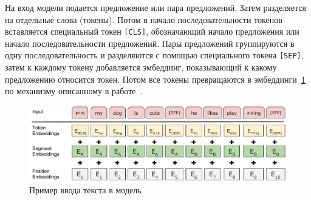\documentclass[PI, VKR]{HSEUniversity}
\begin{document}
На вход модели подается предложение или пара предложений. Затем разделяется на отдельные слова (токены). Потом в начало последовательности токенов вставляется специальный токен \texttt{[CLS]}, обозначающий начало предложения или начало последовательности предложений. Пары предложений группируются в одну последовательность и разделяются с помощью специального токена \texttt{[SEP]}, затем к каждому токену добавляется эмбеддинг, показывающий к какому предложению относится токен. Потом все токены превращаются в эмбеддинги~\ref{fig:inputemebeddings} по механизму описанному в работе~\autocite{vaswani_attention_2017}.

\begin{figure}[h]
\centering
\includegraphics[width=.9\linewidth]{img/Input_Emebeddings.pdf}
\caption{\label{fig:inputemebeddings}Пример ввода текста в модель}
\end{figure}
\end{document}
